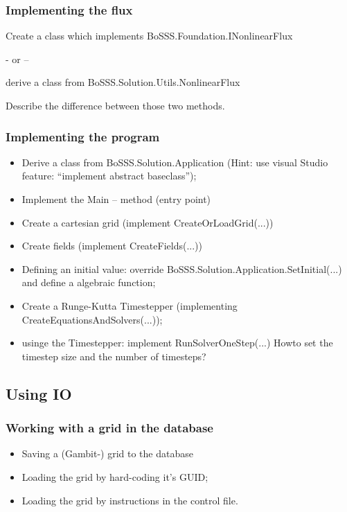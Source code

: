 \subsubsection{Implementing the flux}

Create a class which implements BoSSS.Foundation.INonlinearFlux

- or --

derive a class from BoSSS.Solution.Utils.NonlinearFlux

Describe the difference between those two methods.

\subsubsection{Implementing the program}

\begin{itemize}
  \item Derive a  class from BoSSS.Solution.Application
        (Hint: use visual Studio feature: ``implement abstract baseclass'');
  \item Implement the Main -- method (entry point)
  \item Create a cartesian grid (implement CreateOrLoadGrid(...))
  \item Create fields (implement CreateFields(...))
  \item Defining an initial value: override BoSSS.Solution.Application.SetInitial(...) 
        and define a algebraic function;
  \item Create a Runge-Kutta Timestepper (implementing CreateEquationsAndSolvers(...));
  \item usinge the Timestepper: implement RunSolverOneStep(...)
        Howto set the timestep size and the number of timesteps?
\end{itemize}

\subsection{Using IO}

\subsubsection{Working with a grid in the database}

\begin{itemize}
  \item Saving a (Gambit-) grid to the database
  \item Loading the grid by hard-coding it's GUID;
  \item Loading the grid by instructions in the control file.
\end{itemize}

